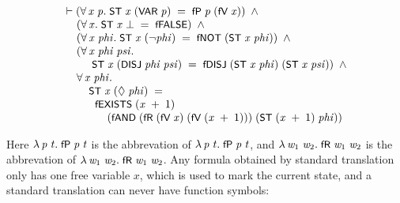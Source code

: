\documentclass[letterpaper]{article}
\renewcommand{\HOLConst}[1]{{\textsf{\upshape\small #1}}}
\renewcommand{\HOLinline}[1]{\ensuremath{#1}}
\newenvironment{holmath}{\begin{displaymath}\begin{array}{l}}{\end{array}\end{displaymath}\ignorespacesafterend}
\begin{document}
\begin{holmath}
  \ensuremath{\HOLTokenTurnstile}(\HOLSymConst{\HOLTokenForall{}}\HOLBoundVar{x}\;\HOLBoundVar{p}.\;\HOLConst{ST}\;\HOLBoundVar{x}\;(\HOLConst{VAR}\;\HOLBoundVar{p})\;\HOLSymConst{=}\;\HOLConst{fP}\;\HOLBoundVar{p}\;(\HOLConst{fV}\;\HOLBoundVar{x}))\;\HOLSymConst{\HOLTokenConj{}}\\
\;\;\;\;\;(\HOLSymConst{\HOLTokenForall{}}\HOLBoundVar{x}.\;\HOLConst{ST}\;\HOLBoundVar{x}\;\HOLSymConst{\ensuremath{\bot}}\;\HOLSymConst{=}\;\HOLConst{fFALSE})\;\HOLSymConst{\HOLTokenConj{}}\\
\;\;\;\;\;(\HOLSymConst{\HOLTokenForall{}}\HOLBoundVar{x}\;\HOLBoundVar{phi}.\;\HOLConst{ST}\;\HOLBoundVar{x}\;(\HOLSymConst{\HOLTokenNeg{}}\HOLBoundVar{phi})\;\HOLSymConst{=}\;\HOLConst{fNOT}\;(\HOLConst{ST}\;\HOLBoundVar{x}\;\HOLBoundVar{phi}))\;\HOLSymConst{\HOLTokenConj{}}\\
\;\;\;\;\;(\HOLSymConst{\HOLTokenForall{}}\HOLBoundVar{x}\;\HOLBoundVar{phi}\;\HOLBoundVar{psi}.\\
\;\;\;\;\;\;\;\;\;\;\HOLConst{ST}\;\HOLBoundVar{x}\;(\HOLConst{DISJ}\;\HOLBoundVar{phi}\;\HOLBoundVar{psi})\;\HOLSymConst{=}\;\HOLConst{fDISJ}\;(\HOLConst{ST}\;\HOLBoundVar{x}\;\HOLBoundVar{phi})\;(\HOLConst{ST}\;\HOLBoundVar{x}\;\HOLBoundVar{psi}))\;\HOLSymConst{\HOLTokenConj{}}\\
\;\;\;\;\;\HOLSymConst{\HOLTokenForall{}}\HOLBoundVar{x}\;\HOLBoundVar{phi}.\\
\;\;\;\;\;\;\;\;\;\HOLConst{ST}\;\HOLBoundVar{x}\;(\HOLSymConst{\ensuremath{\Diamond}}\;\HOLBoundVar{phi})\;\HOLSymConst{=}\\
\;\;\;\;\;\;\;\;\;\;\;\HOLConst{fEXISTS}\;(\HOLBoundVar{x}\;\HOLSymConst{\ensuremath{+}}\;\HOLNumLit{1})\\
\;\;\;\;\;\;\;\;\;\;\;\;\;\;\;(\HOLConst{fAND}\;(\HOLConst{fR}\;(\HOLConst{fV}\;\HOLBoundVar{x})\;(\HOLConst{fV}\;(\HOLBoundVar{x}\;\HOLSymConst{\ensuremath{+}}\;\HOLNumLit{1})))\;(\HOLConst{ST}\;(\HOLBoundVar{x}\;\HOLSymConst{\ensuremath{+}}\;\HOLNumLit{1})\;\HOLBoundVar{phi}))
\end{holmath}

Here \HOLinline{\HOLTokenLambda{}\HOLBoundVar{p}\;\HOLBoundVar{t}.\;\HOLConst{fP}\;\HOLBoundVar{p}\;\HOLBoundVar{t}} is the abbrevation of \HOLinline{\HOLTokenLambda{}\HOLBoundVar{p}\;\HOLBoundVar{t}.\;\HOLConst{fP}\;\HOLBoundVar{p}\;\HOLBoundVar{t}}, and \HOLinline{\HOLTokenLambda{}\HOLBoundVar{w\sb{\mathrm{1}}}\;\HOLBoundVar{w\sb{\mathrm{2}}}.\;\HOLConst{fR}\;\HOLBoundVar{w\sb{\mathrm{1}}}\;\HOLBoundVar{w\sb{\mathrm{2}}}} is the abbrevation of \HOLinline{\HOLTokenLambda{}\HOLBoundVar{w\sb{\mathrm{1}}}\;\HOLBoundVar{w\sb{\mathrm{2}}}.\;\HOLConst{fR}\;\HOLBoundVar{w\sb{\mathrm{1}}}\;\HOLBoundVar{w\sb{\mathrm{2}}}}. Any formula obtained by standard translation only has one free variable $x$, which is used to mark the current state, and a standard translation can never have function symbols:
\end{document}
